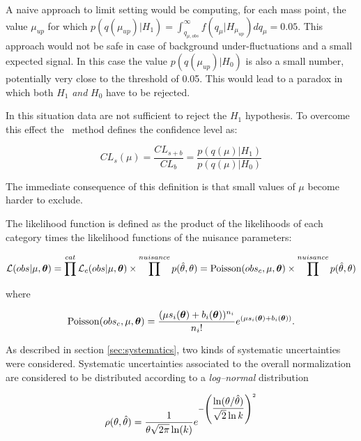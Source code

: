 A naive approach to limit setting would be computing, for each mass point, the value $\mu_{up}$ for which $p(q(\mu_{up}) | H_1) = \int_{q_{\mu,obs}}^{\infty}f(q_\mu|H_{\mu_{up}})dq_\mu = 0.05$. This approach would not be safe in case of background under-fluctuations and a small expected signal. In this case the value $p(q(\mu_{up}) | H_0)$ is also a small number, potentially very close to the threshold of 0.05. This would lead to a paradox in which both $H_1$ \emph{and} $H_0$ have to be rejected.

In this situation data are not sufficient to reject the $H_1$ hypothesis. To overcome this effect the \CLs\ method defines the confidence level as:

\begin{equation}
CL_s(\mu) = \dfrac{CL_{s+b}}{CL_b} = \dfrac{p(q(\mu) | H_1)}{p(q(\mu) | H_0)}
\end{equation}

The immediate consequence of this definition is that small values of $\mu$ become harder to exclude.

The likelihood function is defined as the product of the likelihoods of each category times the likelihood functions of the nuisance parameters:

\begin{equation}
\mathcal{L}(obs|\mu, \boldsymbol\theta) = \prod^{cat} \mathcal{L}_c(obs|\mu, \boldsymbol\theta) \times \prod^{nuisance} p(\hat{\theta},\theta) = \operatorname{Poisson}(obs_c, \mu, \boldsymbol\theta) \times \prod^{nuisance} p(\hat{\theta},\theta)
\end{equation}

where

\begin{equation}
\operatorname{Poisson}(obs_c, \mu, \boldsymbol\theta) = \dfrac{(\mu s_i(\boldsymbol\theta) + b_i(\boldsymbol\theta))^{n_i}}{n_i!}e^{(\mu s_i(\boldsymbol\theta) + b_i(\boldsymbol\theta))}.
\end{equation}

As described in section \ref{sec:systematics}, two kinds of systematic uncertainties were considered. Systematic uncertainties associated to the overall normalization are considered to be distributed according to a \emph{log--normal} distribution 

\begin{equation}
\rho(\theta, \hat{\theta}) = \dfrac{1}{\theta\sqrt{2\pi}\operatorname{ln}(k)} e^{-\left(\dfrac{\operatorname{ln}(\theta/\hat{\theta})}{\sqrt{2}\operatorname{ln}k}\right)^2}
\end{equation}

